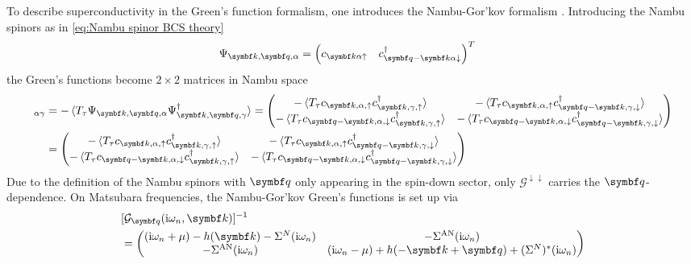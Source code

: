 \documentclass[../notes.tex]{subfiles}
\begin{document}
To describe superconductivity in the Green's function formalism, one introduces the Nambu-Gor'kov formalism \cite{georgesDynamicalMeanfieldTheory1996}.
Introducing the Nambu spinors as in \cref{eq:Nambu spinor BCS theory}
\begin{align}
	\Psi_{\vb{k}, \vb{q}, \alpha} &= 
	\begin{pmatrix}
		c_{\vb{k} \alpha \uparrow} & 
		c_{\vb{q} -\vb{k} \alpha \downarrow}^{\dagger}
	\end{pmatrix}^{T}
\end{align}
the Green's functions become \(2 \times 2\) matrices in Nambu space
\begin{align}
	[\mathcal{G}_{\vb{q}} (\tau, \vb{k})]_{\alpha \gamma} &= -\braket{T_{\tau} \Psi_{\vb{k}, \vb{q}, \alpha} \Psi_{\vb{k}, \vb{q}, \gamma}^{\dagger}} = \begin{pmatrix}
		-\braket{T_{\tau} c_{\vb{k}, \alpha, \uparrow} c_{\vb{k}, \gamma, \uparrow}^{\dagger}} &
		-\braket{T_{\tau} c_{\vb{k}, \alpha, \uparrow} c_{\vb{q} - \vb{k}, \gamma, \downarrow}^{\dagger}} \\
		-\braket{T_{\tau} c_{\vb{q} - \vb{k}, \alpha, \downarrow} c_{\vb{k}, \gamma, \uparrow}^{\dagger}} &
		-\braket{T_{\tau} c_{\vb{q} - \vb{k}, \alpha, \downarrow} c_{\vb{q} - \vb{k}, \gamma, \downarrow}^{\dagger}}
	\end{pmatrix} \nonumber \\
	&= \begin{pmatrix}
		-\braket{T_{\tau} c_{\vb{k}, \alpha, \uparrow} c_{\vb{k}, \gamma, \uparrow}^{\dagger}} &
		-\braket{T_{\tau} c_{\vb{k}, \alpha, \uparrow} c_{\vb{q} - \vb{k}, \gamma, \downarrow}^{\dagger}} \\
		-\braket{T_{\tau} c_{\vb{q} - \vb{k}, \alpha, \downarrow} c_{\vb{k}, \gamma, \uparrow}^{\dagger}} &
		-\braket{T_{\tau} c_{\vb{q} - \vb{k}, \alpha, \downarrow} c_{\vb{q} - \vb{k}, \gamma, \downarrow}^{\dagger}}
	\end{pmatrix}
\end{align}
Due to the definition of the Nambu spinors with \(\vb{q}\) only appearing in the spin-down sector, only \(\mathcal{G}^{\downarrow \downarrow}\) carries the \(\vb{q}\)-dependence.
On Matsubara frequencies, the Nambu-Gor'kov Green's functions is set up via
\begin{align}
	&[\mathcal{G}_{\vb{q}} (\iu \omega_n, \vb{k})]^{-1} \nonumber \\
	&= \begin{pmatrix}
		(\iu \omega_n + \mu) - h (\vb{k}) - \Sigma^{N} (\iu \omega_n) & -\Sigma^{\mathrm{AN}} (\iu \omega_n) \\
		-\Sigma^{\mathrm{AN}} (\iu \omega_n) & (\iu \omega_n - \mu) + h (-\vb{k} + \vb{q}) + (\Sigma^{N})^* (\iu \omega_n)
	\end{pmatrix}
\end{align}
\end{document}
